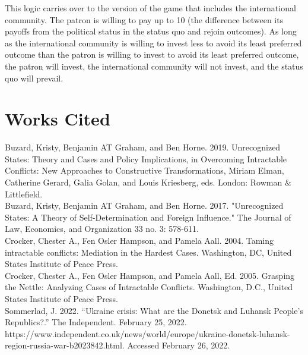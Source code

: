 \documentclass[12pt]{article}
\begin{document}
This logic carries over to the version of the game that includes the international community. The patron is willing to pay up to 10 (the difference between its payoffs from the political status in the status quo and rejoin outcomes). As long as the international community is willing to invest less to avoid its least preferred outcome than the patron is willing to invest to avoid its least preferred outcome, the patron will invest, the international community will not invest, and the status quo will prevail.

\section{Works Cited}

Buzard, Kristy, Benjamin AT Graham, and Ben Horne. 2019. Unrecognized States: Theory and Cases and Policy Implications, in Overcoming Intractable Conflicts: New Approaches to Constructive Transformations, Miriam Elman, Catherine Gerard, Galia Golan, and Louis Kriesberg, eds. London: Rowman $\&$ Littlefield.\\

Buzard, Kristy, Benjamin AT Graham, and Ben Horne. 2017. "Unrecognized States: A Theory of Self-Determination and Foreign Influence." The Journal of Law, Economics, and Organization 33 no. 3: 578-611.\\

Crocker, Chester A., Fen Osler Hampson, and Pamela Aall. 2004. Taming intractable conflicts: Mediation in the Hardest Cases. Washington, DC, United States Institute of Peace Press. \\

Crocker, Chester A., Fen Osler Hampson, and Pamela Aall, Ed. 2005. Grasping the Nettle: Analyzing Cases of Intractable Conflicts. Washington, D.C., United States Institute of Peace Press.\\

Sommerlad, J. 2022. ``Ukraine crisis: What are the Donetsk and Luhansk People’s Republics?.'' The Independent. February 25, 2022. https://www.independent.co.uk/news/world/europe/ukraine-donetsk-luhansk-region-russia-war-b2023842.html. Accessed February 26, 2022.
\end{document}
